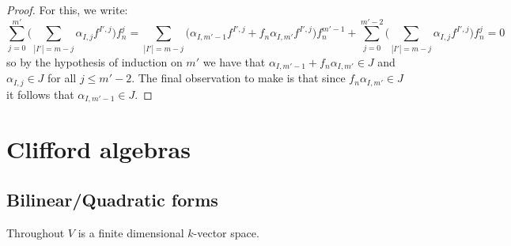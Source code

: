 \documentclass[12pt]{article}
\theoremstyle{plain}
\theoremstyle{definition}
\begin{document}
\begin{proof}
%
For this, we write:
\[\sum_{j = 0}^{m'}\Big(\sum_{|I'| = m-j}\alpha_{I,j}f^{I',j}\Big)f_n^j = \sum_{|I'| = m - j}\big(\alpha_{I,m'-1}f^{I',j} + f_n\alpha_{I,m'}f^{I',j}\big)f_n^{m'-1} + \sum_{j = 0}^{m' - 2}\Big(\sum_{|I'| = m-j}\alpha_{I,j}f^{I',j}\Big)f_n^{j} = 0\]
so by the hypothesis of induction on $m'$ we have that $\alpha_{I,m'-1} + f_n\alpha_{I,m'} \in J$ and $\alpha_{I,j} \in J$ for all $j \leq m' - 2$. The final observation to make is that since $f_n\alpha_{I,m'} \in J$ it follows that $\alpha_{I,m'-1} \in J$.
\end{proof}
%
\section{Clifford algebras}
\subsection{Bilinear/Quadratic forms}
Throughout $V$ is a finite dimensional $k$-vector space. 
\end{document}
